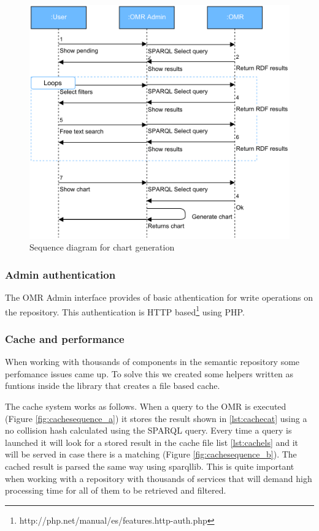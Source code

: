 \begin{figure}[h]
	\centering
	\includegraphics[width=350pt]{graphics/Diagrama_secuencia_graficas.pdf}
	\caption{Sequence diagram for chart generation}
	\label{fig:chartsequence}
\end{figure}

\subsubsection{Admin authentication}
The OMR Admin interface provides of basic athentication for write operations on the repository. This authentication is HTTP based\footnote{http://php.net/manual/es/features.http-auth.php} using PHP.


\subsubsection{Cache and performance}
\label{subsubsec:cacheperfomance}
When working with thousands of components in the semantic repository some perfomance issues came up. To solve this we created some helpers written as funtions inside the library that creates a file based cache.

The cache system works as follows. When a query to the OMR is executed (Figure \ref{fig:cachesequence_a}) it stores the result shown in \ref{lst:cachecat} using a no collision hash calculated using the SPARQL query. Every time a query is launched it will look for a stored result in the cache file list \ref{lst:cachels} and it will be served in case there is a matching (Figure \ref{fig:cachesequence_b}). The cached result is parsed the same way using sparqllib.
This is quite important when working with a repository with thousands of services that will demand high processing time for all of them to be retrieved and filtered.

